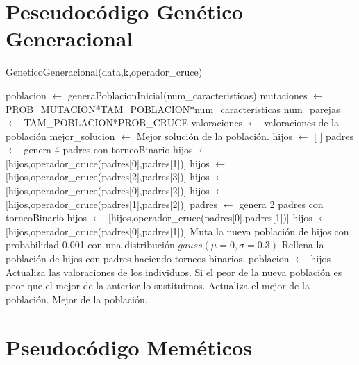 \documentclass[12pt,a4paper]{article}
\begin{document}
	\newpage

	\section{Peseudocódigo Genético Generacional}
	\label{sec:GG}

	\begin{algorithm}
		\caption{GeneticoGeneracional(data,k,operador\_cruce)}
		\begin{algorithmic}
			\STATE poblacion $\leftarrow$ generaPoblacionInicial(num\_caracteristicas)
			\STATE mutaciones $\leftarrow$ PROB\_MUTACION*TAM\_POBLACION*num\_caracteristicas
			\STATE num\_parejas $\leftarrow$ TAM\_POBLACION*PROB\_CRUCE
			\STATE valoraciones $\leftarrow$ valoraciones de la población
			\STATE mejor\_solucion $\leftarrow$ Mejor solución de la población.
				\STATE hijos $\leftarrow$ [ ]
						\STATE padres $\leftarrow$ genera 4 padres con torneoBinario
						\STATE hijos $\leftarrow$ [hijos,operador\_cruce(padres[0],padres[1])]
						\STATE hijos $\leftarrow$ [hijos,operador\_cruce(padres[2],padres[3])]
						\STATE hijos $\leftarrow$ [hijos,operador\_cruce(padres[0],padres[2])]
						\STATE hijos $\leftarrow$ [hijos,operador\_cruce(padres[1],padres[2])]
					\ELSE
						\STATE padres $\leftarrow$ genera 2 padres con torneoBinario
						\STATE hijos $\leftarrow$ [hijos,operador\_cruce(padres[0],padres[1])]
						\STATE hijos $\leftarrow$ [hijos,operador\_cruce(padres[0],padres[1])]
					\ENDIF
				\ENDFOR
				\STATE Muta la nueva población de hijos con probabilidad 0.001 con una distribución $gauss(\mu=0,\sigma=0.3)$
				\STATE Rellena la población de hijos con padres haciendo torneos binarios.
				\STATE poblacion $\leftarrow$ hijos
				\STATE Actualiza las valoraciones de los individuos.
				\STATE Si el peor de la nueva población es peor que el mejor de la anterior lo sustituimos.
				\STATE Actualiza el mejor de la población.
			\ENDWHILE
			\RETURN Mejor de la población.
		\end{algorithmic}
	\end{algorithm}

	\newpage

	\section{Pseudocódigo Meméticos}
	\label{sec:memeticos}
\end{document}

